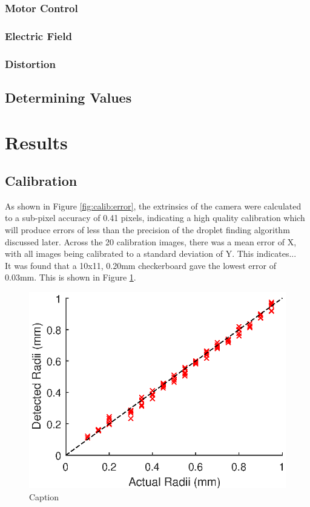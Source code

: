 \documentclass{physics_article_B}
\begin{document}
        \subsubsection{Motor Control}
    	\subsubsection{Electric Field}
    	\subsubsection{Distortion}
    
    \subsection{Determining Values}

    
\section{Results}

    \subsection{Calibration}
    As shown in Figure \ref{fig:calib:error}, the extrinsics of the camera were calculated to a sub-pixel accuracy of 0.41 pixels, indicating a high quality calibration which will produce errors of less than the precision of the droplet finding algorithm discussed later. Across the 20 calibration images, there was a mean error of X, with all images being calibrated to a standard deviation of Y. This indicates...\\
        
    
    It was found that a 10x11, 0.20mm checkerboard gave the lowest error of 0.03mm. This is shown in Figure \ref{fig:calibsize}. 
        
        \begin{figure}[H]
            \centering
            \includegraphics{Figures/CameraCalib.eps}
            \caption{Caption}
            \label{fig:calibsize}
        \end{figure}
        
\end{document}
